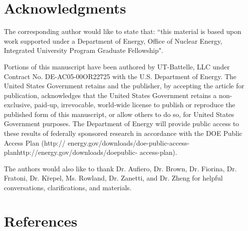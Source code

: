 \documentclass[review]{elsarticle}
\begin{document}
\section{Acknowledgments} \label{sec:ack}
The corresponding author would like to state that: ``this material is based
upon work supported under a Department of Energy, Office of Nuclear Energy,
Integrated University Program Graduate Fellowship". 
\par Portions of this manuscript have been authored by UT-Battelle, LLC under Contract No.
DE-AC05-00OR22725 with the U.S. Department of Energy. The United States
Government retains and the publisher, by accepting the article for publication,
acknowledges that the United States Government retains a non-exclusive, paid-up,
irrevocable, world-wide license to publish or reproduce the published form of this
manuscript, or allow others to do so, for United States Government purposes. The
Department of Energy will provide public access to these results of federally
sponsored research in accordance with the DOE Public Access Plan (http://
energy.gov/downloads/doe-public-access-planhttp://energy.gov/downloads/doepublic-
access-plan).
\par The authors would also
like to thank Dr. Aufiero, Dr. Brown, Dr. Fiorina, Dr. Fratoni,
Dr. K{\u r}epel, Ms. Rowland,
Dr. Zanetti, and Dr. Zheng for helpful conversations, clarifications, and
materials.  

\section*{References}


\end{document}
